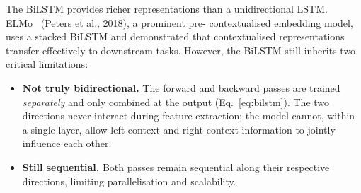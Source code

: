 The BiLSTM provides richer representations than a unidirectional LSTM.
ELMo~\cite{peters2018elmo} (Peters et al., 2018), a prominent pre-\bert{}
contextualised embedding model, uses a stacked BiLSTM and demonstrated that
contextualised representations transfer effectively to downstream tasks.
However, the BiLSTM still inherits two critical limitations:

\begin{itemize}[leftmargin=2em]
  \item \textbf{Not truly bidirectional.} The forward and backward passes are
        trained \emph{separately} and only combined at the output
        (Eq.~\ref{eq:bilstm}). The two directions never interact during feature
        extraction; the model cannot, within a single layer, allow left-context
        and right-context information to jointly influence each other.
  \item \textbf{Still sequential.} Both passes remain sequential along their
        respective directions, limiting parallelisation and scalability.
\end{itemize}
